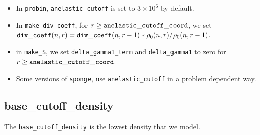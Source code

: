 \begin{itemize}

\item In {\tt probin}, {\tt anelastic\_cutoff} is set to $3\times 10^6$ by default.

\item In {\tt make\_div\_coeff}, for 
  $r \ge {\tt anelastic\_cutoff\_coord}$, we set
  ${\tt div\_coeff}(n,r) = {\tt div\_coeff}(n,r-1) * \rho_0(n,r)/\rho_0(n,r-1)$.

\item in {\tt make\_S}, we set {\tt delta\_gamma1\_term} and {\tt delta\_gamma1} 
  to zero for $r \ge {\tt anelastic\_cutoff\_coord}$.

\item Some versions of {\tt sponge}, use {\tt anelastic\_cutoff} in a problem dependent way.

\end{itemize}

\subsection{base\_cutoff\_density}\label{Sec:Base Cutoff Density}

The {\tt base\_cutoff\_density} is the lowest density that we model.

